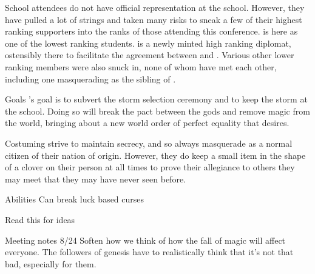 \documentclass[blue]{GL2020}
\begin{document}


School attendees
\pCult{} do not have official representation at the school. However, they have pulled a lot of strings and taken many risks to sneak a few of their highest ranking supporters into the ranks of those attending this conference. \cCultLeader is here as one of the lowest ranking students. \cTechBishop is a newly minted high ranking diplomat, ostensibly there to facilitate the agreement between \pTech and \pFarm. Various other lower ranking members were also snuck in, none of whom have met each other, including one masquerading as the sibling of \cAmnesiac{}.


Goals
\pCult's goal is to subvert the storm selection ceremony and to keep the storm at the school. Doing so will break the pact between the gods and remove magic from the world, bringing about a new world order of perfect equality that \cCultLeader desires.

Costuming
\pCult strive to maintain secrecy, and so always masquerade as a normal citizen of their nation of origin. However, they do keep a small item in the shape of a clover on their person at all times to prove their allegiance to others they may meet that they may have never seen before.



Abilities
Can break luck based curses



Read this for ideas \/

Meeting notes 8/24
Soften how we think of how the fall of magic will affect everyone. The followers of genesis have to realistically think that it’s not that bad, especially for them.
\end{document}
